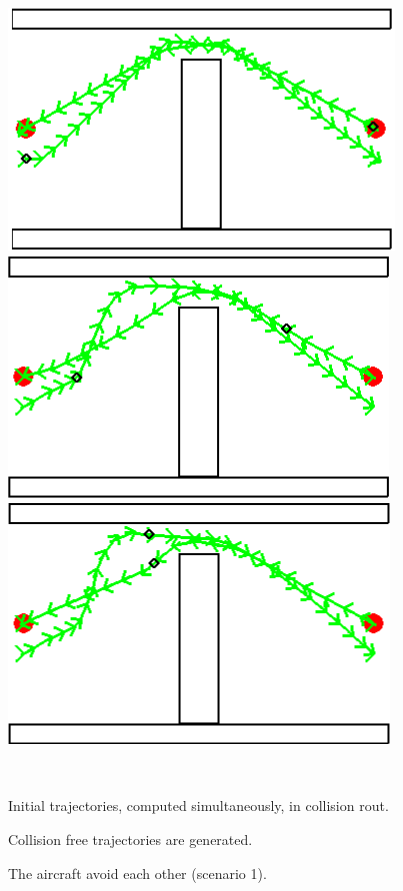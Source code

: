 \begin{figure}[!htb]
    \centering
    \begin{minipage}[b]{.3\linewidth}
        \centering
        \includegraphics[width=0.6\linewidth]{Figures/07_simulation/basic/twoAir0.png}
    \end{minipage}%
    \hfill%
    \begin{minipage}[b]{.3\linewidth}
        \centering
        \includegraphics[width=0.6\linewidth]{Figures/07_simulation/basic/twoAir1.png}
    \end{minipage}%
    \hfill%
    \begin{minipage}[b]{.3\linewidth}
        \centering
        \includegraphics[width = 0.6 \linewidth]{Figures/07_simulation/basic/twoAir2.png}
    \end{minipage}\\[-7pt]
    \begin{minipage}[t]{.3\linewidth}
        \caption{Initial trajectories, computed simultaneously, in collision rout.}
        \label{fig:twoAir0}
    \end{minipage}%
    \hfill%
    \begin{minipage}[t]{.3\linewidth}
        \caption{Collision free trajectories are generated.}
        \label{fig:twoAir1}
    \end{minipage}%
    \hfill%
    \begin{minipage}[t]{.3\linewidth}
        \caption{The aircraft avoid each other (scenario 1).}
        \label{fig:twoAir2}
    \end{minipage}%
\end{figure}